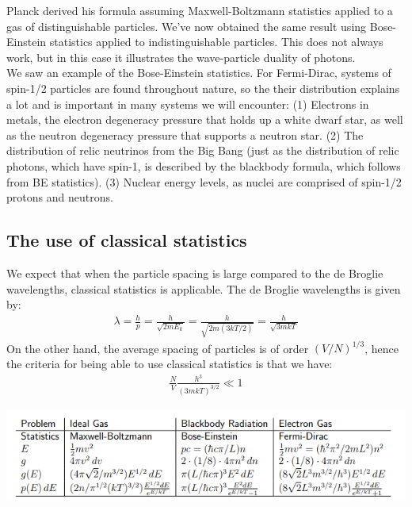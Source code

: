 \documentclass[11pt]{article}
\theoremstyle{break}
\theoremstyle{break}
\begin{document}
Planck derived his formula assuming Maxwell-Boltzmann statistics applied to a gas of distinguishable particles. We've now obtained the same result using Bose-Einstein 
statistics applied to indistinguishable particles. This does not always work, but in this case it illustrates the wave-particle duality of photons.\\

We saw an example of the Bose-Einstein statistics. For Fermi-Dirac, systems of spin-1/2 particles are found throughout nature, so the their distribution explains a lot and is 
important in many systems we will encounter: (1) Electrons in metals, the electron degeneracy pressure that holds up a white dwarf 
star, as well as the neutron degeneracy pressure that supports 
a neutron star. (2) The distribution of relic neutrinos from the Big Bang (just as the distribution of relic photons, which have spin-1, is described by the blackbody formula, which follows from BE statistics).
(3) Nuclear energy levels, as nuclei are comprised of spin-1/2 protons and neutrons.\\ 

\subsection{The use of classical statistics}
We expect that when the particle spacing is large compared to the de Broglie wavelengths, classical statistics is applicable. The de Broglie wavelengths is given by:
\begin{align*}
\lambda = \frac{h}{p} = \frac{h}{\sqrt{2m E_k}} = \frac{h}{\sqrt{2m(3kT/2)}} = \frac{h}{\sqrt{3m kT}}
\end{align*}
On the other hand, the average spacing of particles is of order $( V/N)^{1/3}$, hence the criteria for being able to use classical statistics is that we have:
\begin{align*}
\frac{N}{V}\frac{h^3}{(3mkT)^{3/2}} \ll 1
\end{align*}


\hfill\break
\hfill\break
\hfill\break
\begin{center}
\includegraphics[scale=1]{StatEX}
\end{center}
\newpage
\end{document}
